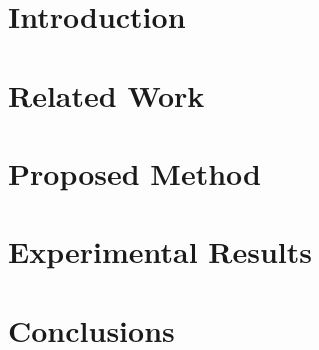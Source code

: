 

\chapter{Introduction} \label{ch:1-introduction}
	

\chapter{Related Work} \label{ch:2-background}
	

\chapter{Proposed Method} \label{ch:3-proposed}
	

\chapter{Experimental Results} \label{ch:4-simulation}
	

\chapter{Conclusions} \label{ch:5-conclusion}
	


